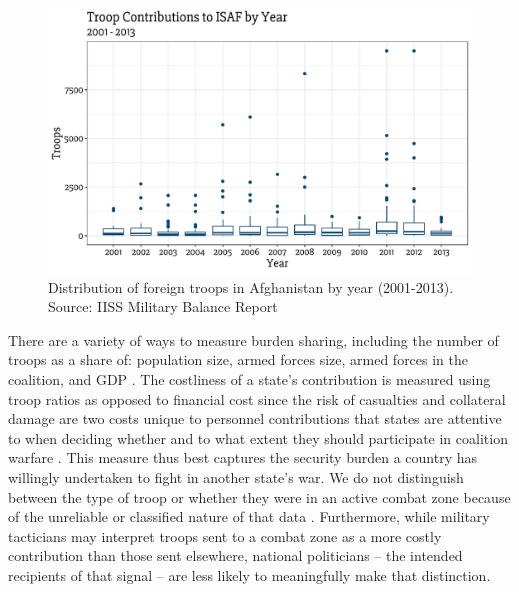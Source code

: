 \documentclass[12pt,letterpaper]{article}
\begin{document}
		\begin{figure}[H]
			\centering
			\includegraphics[width = \textwidth]{figures/troop_year.pdf}
			\caption{Distribution of foreign troops in Afghanistan by year (2001-2013). Source: IISS Military Balance Report}
			\label{fig:afghan_total}
		\end{figure}
		
		There are a variety of ways to measure burden sharing, including the number of troops as a share of: population size, armed forces size, armed forces in the coalition, and GDP \citep[668-669]{hartley_natoburdensharingfuture_1999}. The costliness of a state's contribution is measured using troop ratios as opposed to financial cost since the risk of casualties and collateral damage are two costs unique to personnel contributions that states are attentive to when deciding whether and to what extent they should participate in coalition warfare \citep{ringsmose_natoburdensharingredux_2010, chivvis_topplingqaddafilibya_2014, vonhlatky_cashcombatamerica_2015, haesebrouck_natoburdensharing_2017}. This measure thus best captures the security burden a country has willingly undertaken to fight in another state's war. We do not distinguish between the type of troop or whether they were in an active combat zone because of the unreliable or classified nature of that data \citep[44-45]{bogers_missionafghanistanwho_2013}. Furthermore, while military tacticians may interpret troops sent to a combat zone as a more costly contribution than those sent elsewhere, national politicians -- the intended recipients of that signal -- are less likely to meaningfully make that distinction.
\end{document}
